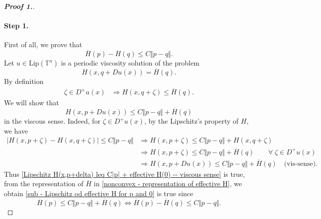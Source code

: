 \documentclass[12pt, oneside]{amsart}  	%
\begin{document}
\begin{proof}[\textbf{Proof 1.}]
\paragraph{\textbf{Step 1.}} First of all, we prove that
\begin{equation}\label{sub - Lipschitz od effective H for p and 0}
\overline{H}(p) - \overline{H}(q) \leq C\Vert p - q\Vert.
\end{equation}
Let $u\in \text{Lip}(\mathbb{T}^n)$ is a periodic viscosity solution of the problem
\begin{equation}\label{Lipschitz E_q}
H(x,q + Du(x)) = \overline{H}(q)\tag{$E_q$}.
\end{equation}
By definition
\begin{align*}
\zeta\in D^+u(x) &\Longrightarrow H(x,q+\zeta) \leq  \overline{H}(q).
\end{align*}
We will show that
\begin{equation}\label{Lipschitz H(x,p+delta) leq C|p| + effective H(0) -- viscous sense}
H(x,p+Du(x)) \leq C\Vert p-q\Vert + \overline{H}(q)
\end{equation}
in the viscous sense. Indeed, for $\zeta\in D^+u(x)$, by the Lipschitz's property of $H$, we have
\begin{align*}
|H(x,p+\zeta) - H(x,q+\zeta)| \leq C\Vert p-q\Vert &\Longrightarrow
H(x,p+\zeta)\leq C\Vert p-q\Vert + H(x,q+\zeta)   \\
 &\Longrightarrow H(x,p+\zeta)\leq  C\Vert p-q\Vert + \overline{H}(q) \quad\quad \forall\; \zeta\in D^+u(x)\\
 &\Longrightarrow  H(x,p+Du(x)) \leq C\Vert p-q\Vert + \overline{H}(q) \quad\text{(vis-sense)}.
\end{align*}
Thus \eqref{Lipschitz H(x,p+delta) leq C|p| + effective H(0) -- viscous sense} is true, from the representation of $\overline{H}$ in \eqref{nonconvex - representation of effective H}, we obtain \eqref{sub - Lipschitz od effective H for p and 0} is true since
\begin{equation*}
\overline{H}(p) \leq C\Vert p-q\Vert + \overline{H}(q) \Longleftrightarrow \overline{H}(p) - \overline{H}(q) \leq C\Vert p-q\Vert.
\end{equation*}
\vspace*{0.2cm}


\end{proof}
\end{document}
